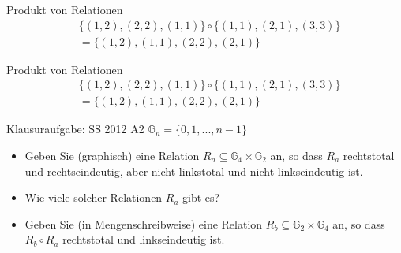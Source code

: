 \begin{frame}{Produkt von Relationen}
  \begin{align*}
    &\{(1,2),(2,2),(1,1)\}\circ \{(1,1),(2,1),(3,3)\}\\
    &=\{(1,2),(1,1),(2,2),(2,1)\}
  \end{align*}
  \begin{center}
  \end{center}
\end{frame}

\begin{frame}{Produkt von Relationen}
  \begin{align*}
    &\{(1,2),(2,2),(1,1)\}\circ \{(1,1),(2,1),(3,3)\}\\
    &=\{(1,2),(1,1),(2,2),(2,1)\}
  \end{align*}
  \begin{center}
  \end{center}
\end{frame}

\begin{frame}{Klausuraufgabe: SS 2012 A2}
  $\mathbb{G}_n=\{0,1,...,n-1\}$
  \begin{itemize}
    \item Geben Sie (graphisch) eine Relation $R_a\subseteq \mathbb{G}_4\times \mathbb{G}_2$ an, so dass $R_a$ rechtstotal und rechtseindeutig, aber nicht linkstotal und nicht linkseindeutig ist.
    \item Wie viele solcher Relationen $R_a$ gibt es?
    \item Geben Sie (in Mengenschreibweise) eine Relation $R_b\subseteq\mathbb{G}_2\times\mathbb{G}_4$ an, so dass $R_b\circ R_a$ rechtstotal und linkseindeutig ist.
  \end{itemize}
\end{frame}

